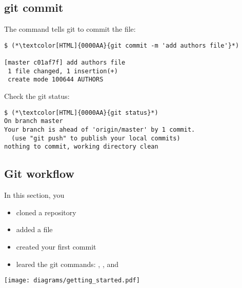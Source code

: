 \subsection{git commit}
\begin{frame}[fragile]
  \subslidetitle

  The command  tells git to commit the file:
  \begin{lstlisting}
$ (*\textcolor[HTML]{0000AA}{git commit -m 'add authors file'}*)

[master c01af7f] add authors file
 1 file changed, 1 insertion(+)
 create mode 100644 AUTHORS
  \end{lstlisting}

  Check the git status:
  \begin{lstlisting}
$ (*\textcolor[HTML]{0000AA}{git status}*)
On branch master
Your branch is ahead of 'origin/master' by 1 commit.
  (use "git push" to publish your local commits)
nothing to commit, working directory clean
\end{lstlisting}
\end{frame}

\subsection{Git workflow}
\begin{frame}[fragile]
  \subslidetitle

  In this section, you

  \begin{itemize}
    \item cloned a repository
    \item added a file
    \item created your first commit
    \item leared the git commands: , ,  and 
  \end{itemize}

  \centerline{\texttt{[image: diagrams/getting\_started.pdf]}}
\end{frame}


